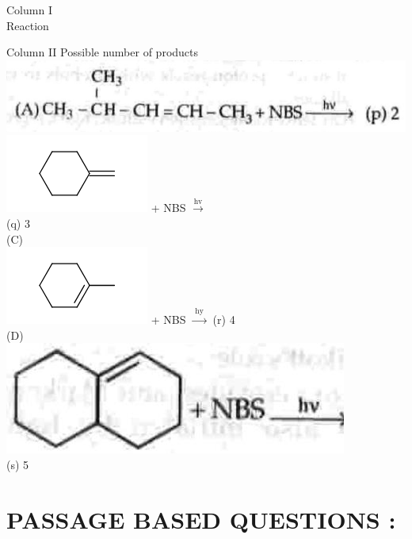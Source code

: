 \documentclass[10pt]{article}
\begin{document}
Column I\\
Reaction

Column II Possible number of products\\
\includegraphics[max width=\textwidth, center]{2025_01_28_8470952b98110cec3aabg-236(1)}\\
\includegraphics{smile-d278909101095049f8d5f5f247b37a1dcb6e1767} + NBS $\xrightarrow{\mathrm{hv}}$\\
(q) 3\\
(C)\\
\includegraphics{smile-dd19b1098677611d1ef36e9cb2168e7b0d23f0b5} + NBS $\xrightarrow{\text { hy }}$ (r) 4\\
(D)\\
\includegraphics[max width=\textwidth, center]{2025_01_28_8470952b98110cec3aabg-236}\\
(s) 5

\section*{PASSAGE BASED QUESTIONS :}
\end{document}
